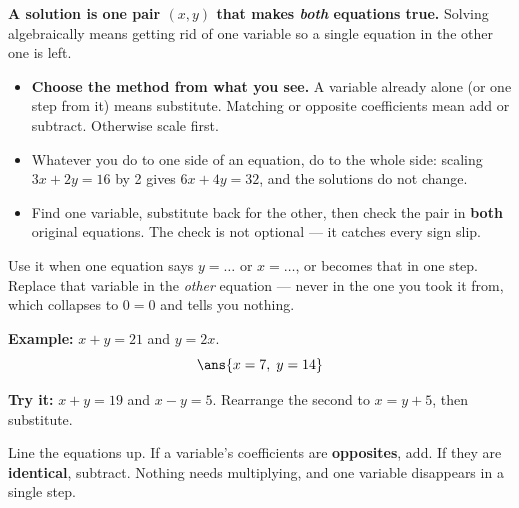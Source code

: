 \documentclass[12pt]{article}
\begin{document}

\begin{formulabox}
\textbf{A solution is one pair $(x, y)$ that makes \emph{both} equations true.}
Solving algebraically means getting rid of one variable so a single equation in
the other one is left.
\begin{itemize}[leftmargin=0.9cm, itemsep=1pt, topsep=1pt]
\item \textbf{Choose the method from what you see.} A variable already alone
(or one step from it) means substitute. Matching or opposite coefficients mean
add or subtract. Otherwise scale first.
\item Whatever you do to one side of an equation, do to the whole side: scaling
$3x + 2y = 16$ by 2 gives $6x + 4y = 32$, and the solutions do not change.
\item Find one variable, substitute back for the other, then check the pair in
\textbf{both} original equations. The check is not optional --- it catches every
sign slip.
\end{itemize}
\end{formulabox}


\begin{formulabox}
Use it when one equation says $y = \ldots$ or $x = \ldots$, or becomes that in
one step. Replace that variable in the \emph{other} equation --- never in the
one you took it from, which collapses to $0 = 0$ and tells you nothing.
\end{formulabox}

\begin{examplebox}
\textbf{Example:} $x + y = 21$ and $y = 2x$.
\[ \ans{x = 7,\; y = 14} \]
\end{examplebox}

\begin{tryitbox}
\textbf{Try it:} $x + y = 19$ and $x - y = 5$. Rearrange the second to
$x = y + 5$, then substitute.

\end{tryitbox}


\begin{formulabox}
Line the equations up. If a variable's coefficients are \textbf{opposites},
add. If they are \textbf{identical}, subtract. Nothing needs multiplying, and
one variable disappears in a single step.
\end{formulabox}
\end{document}
